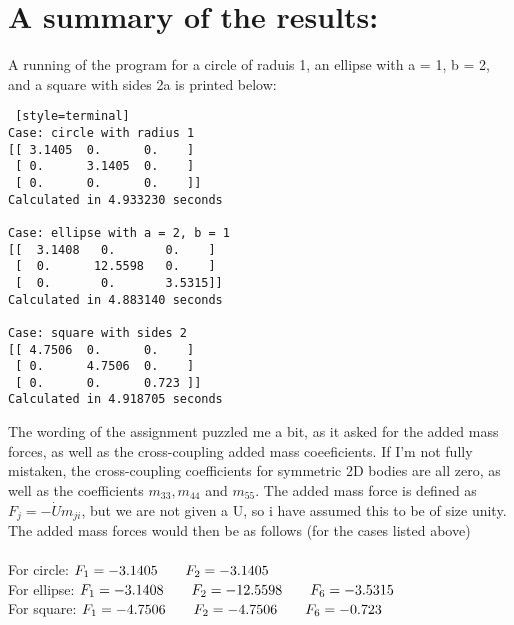 \documentclass[a4paper,english,11pt,twoside]{article}
\newcommand{\tab}{\hspace*{2em}}
\begin{document}
\section*{A summary of the results:}
A running of the program for a circle of raduis 1, an ellipse with a = 1, b = 2, and a square with sides 2a is printed below:\\
\begin{lstlisting} [style=terminal]
Case: circle with radius 1
[[ 3.1405  0.      0.    ]
 [ 0.      3.1405  0.    ]
 [ 0.      0.      0.    ]]
Calculated in 4.933230 seconds

Case: ellipse with a = 2, b = 1
[[  3.1408   0.       0.    ]
 [  0.      12.5598   0.    ]
 [  0.       0.       3.5315]]
Calculated in 4.883140 seconds

Case: square with sides 2
[[ 4.7506  0.      0.    ]
 [ 0.      4.7506  0.    ]
 [ 0.      0.      0.723 ]]
Calculated in 4.918705 seconds
\end{lstlisting}
The wording of the assignment puzzled me a bit, as it asked for the added mass forces, as well as the cross-coupling added mass coeeficients. If I'm not fully mistaken, the cross-coupling coefficients for symmetric 2D bodies are all zero, as well as the coefficients $m_{33}, m_{44}$ and $m_{55}$.  The added mass force is defined as $F_j = -\dot{U}m_{ji}$, but we are not given a U, so i have assumed this to be of size unity. The added mass forces would then be as follows (for the cases listed above)\\
\\
For circle: $F_1 = -3.1405\tab F_2 = -3.1405$\\
For ellipse:  $F_1 = -3.1408\tab F_2 = -12.5598\tab F_6 = -3.5315$\\
For square:  $F_1 = -4.7506\tab F_2 = -4.7506\tab F_6 = -0.723$\\
 
\end{document}
